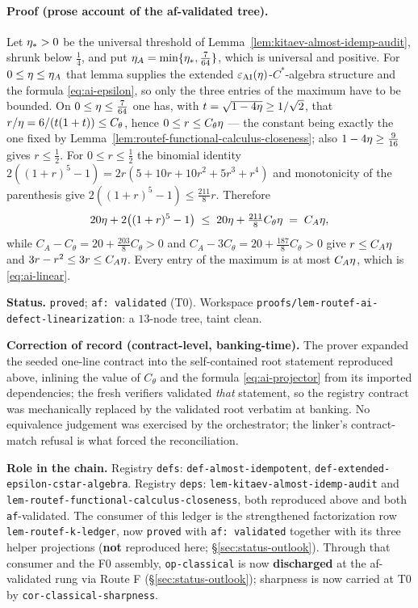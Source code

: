 \paragraph{Proof (prose account of the af-validated tree).}
Let $\eta_{*}>0$ be the universal threshold of Lemma~\ref{lem:kitaev-almost-idemp-audit},
shrunk below $\tfrac14$, and put $\eta_{A}=\min\{\eta_{*},\tfrac7{64}\}$, which is
universal and positive. For $0\le\eta\le\eta_{A}$ that lemma supplies the extended
$\varepsilon_{\mathrm{AI}}(\eta)$-$C^{*}$-algebra structure and the formula
\eqref{eq:ai-epsilon}, so only the three entries of the maximum have to be bounded. On
$0\le\eta\le\tfrac7{64}$ one has, with $t=\sqrt{1-4\eta}\ge1/\sqrt2$, that
$r/\eta=6/(t(1+t))\le C_{\theta}$, hence $0\le r\le C_{\theta}\eta$ --- the constant
being exactly the one fixed by Lemma~\ref{lem:routef-functional-calculus-closeness}; also
$1-4\eta\ge\tfrac9{16}$ gives $r\le\tfrac12$. For $0\le r\le\tfrac12$ the binomial
identity $2((1+r)^{5}-1)=2r(5+10r+10r^{2}+5r^{3}+r^{4})$ and monotonicity of the
parenthesis give $2((1+r)^{5}-1)\le\tfrac{211}{8}r$. Therefore
\[
  20\eta+2\bigl((1+r)^{5}-1\bigr)\;\le\;20\eta+\tfrac{211}{8}C_{\theta}\eta
  \;=\;C_{A}\eta,
\]
while $C_{A}-C_{\theta}=20+\tfrac{203}{8}C_{\theta}>0$ and
$C_{A}-3C_{\theta}=20+\tfrac{187}{8}C_{\theta}>0$ give $r\le C_{A}\eta$ and
$3r-r^{2}\le3r\le C_{A}\eta$. Every entry of the maximum is at most $C_{A}\eta$,
which is \eqref{eq:ai-linear}.

\medskip
\noindent\textbf{Status.} \texttt{proved}; \texttt{af: validated} (T0). Workspace
\texttt{proofs/lem-routef-ai-defect-linearization}: a $13$-node tree, taint clean.

\noindent\textbf{Correction of record (contract-level, banking-time).} The prover expanded
the seeded one-line contract into the self-contained root statement reproduced above,
inlining the value of $C_{\theta}$ and the formula \eqref{eq:ai-projector} from its imported
dependencies; the fresh verifiers validated \emph{that} statement, so the registry contract
was mechanically replaced by the validated root verbatim at banking. No equivalence
judgement was exercised by the orchestrator; the linker's contract-match refusal is what
forced the reconciliation.

\noindent\textbf{Role in the chain.} Registry \texttt{defs}:
\texttt{def-almost-idempotent}, \texttt{def-extended-epsilon-cstar-algebra}. Registry
\texttt{deps}: \texttt{lem-kitaev-almost-idemp-audit} and
\texttt{lem-routef-functional-calculus-closeness}, both reproduced above and both
\texttt{af}-validated. The consumer of this ledger is the strengthened factorization row
\texttt{lem-routef-k-ledger}, now \texttt{proved} with \texttt{af: validated} together
with its three helper projections (\textbf{not} reproduced here;
\S\ref{sec:status-outlook}). Through that consumer and the F0 assembly,
\texttt{op-classical} is now \textbf{discharged} at the af-validated rung via Route F
(\S\ref{sec:status-outlook}); sharpness is now carried at T0 by \texttt{cor-classical-sharpness}.
